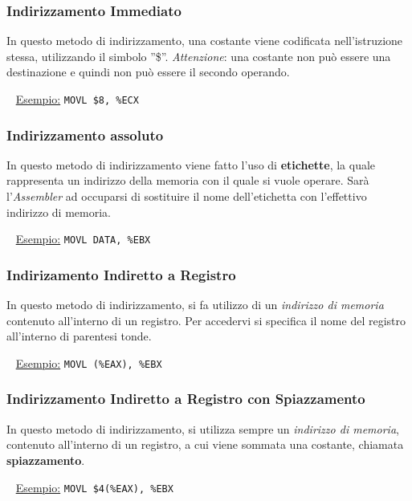 \documentclass[12pt,oneside]{book}
\begin{document}
\subsubsection{Indirizzamento Immediato}
In questo metodo di indirizzamento, una costante viene codificata nell'istruzione stessa, utilizzando il simbolo ''\$''.
\newline \emph{Attenzione}: una costante non può essere una destinazione e quindi non può essere il secondo operando.

~\newline
\underline{Esempio:} \tabto{3cm} \texttt{MOVL \$8, \%ECX}


\subsubsection{Indirizzamento assoluto}
In questo metodo di indirizzamento viene fatto l'uso di \textbf{etichette}, la quale rappresenta un indirizzo della memoria con il quale si vuole operare.
\newline Sarà l'\emph{Assembler} ad occuparsi di sostituire il nome dell'etichetta con l'effettivo indirizzo di memoria.

~\newline
\underline{Esempio:} \tabto{3cm} \texttt{MOVL DATA, \%EBX}


\subsubsection{Indirizamento Indiretto a Registro}
In questo metodo di indirizzamento, si fa utilizzo di un \emph{indirizzo di memoria} contenuto all'interno di un registro. Per accedervi si specifica
il nome del registro all'interno di parentesi tonde.

~\newline
\underline{Esempio:} \tabto{3cm} \texttt{MOVL (\%EAX), \%EBX}

\subsubsection{Indirizzamento Indiretto a Registro con Spiazzamento}
In questo metodo di indirizzamento, si utilizza sempre un \emph{indirizzo di memoria}, contenuto all'interno di un registro, a cui viene sommata una costante, chiamata \textbf{spiazzamento}.

~\newline
\underline{Esempio:} \tabto{3cm} \texttt{MOVL \$4(\%EAX), \%EBX}
\end{document}
